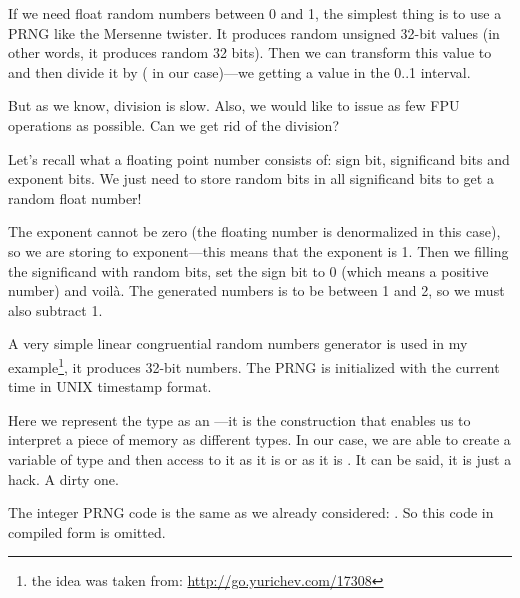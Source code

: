 \label{FPU_PRNG}

If we need float random numbers between 0 and 1, the simplest thing is to use a \ac{PRNG} like
the Mersenne twister. 
It produces random unsigned 32-bit values (in other words, it produces random 32 bits).
Then we can transform this value to \Tfloat and then
divide it by  ( in our case)---we getting a value in the 0..1 interval.

But as we know, division is slow.
Also, we would like to issue as few FPU operations as possible.
Can we get rid of the division?


Let's recall what a floating point number consists of: sign bit, significand bits and exponent bits.
We just need to store random bits in all significand bits to get a random float number!

The exponent cannot be zero (the floating number is denormalized in this case), so we are storing  
to exponent---this means that the exponent is 1. 
Then we filling the significand with random bits, set the sign bit to
0 (which means a positive number) and voilà.
The generated numbers is to be between 1 and 2, so we must also subtract 1.

\newcommand{\URLXOR}{\url{http://go.yurichev.com/17308}}

A very simple linear congruential random numbers generator is used in my 
example\footnote{the idea was taken from: \URLXOR}, it produces 32-bit numbers. 
The \ac{PRNG} is initialized with the current time in UNIX timestamp format.

Here we represent the \Tfloat type as an ---it is the \CCpp construction that enables us
to interpret a piece of memory as different types.
In our case, we are able to create a variable
of type  and then access to it as it is \Tfloat or as it is . 
It can be said, it is just a hack. A dirty one.


The integer \ac{PRNG} code is the same as we already considered: .
So this code in compiled form is omitted.






